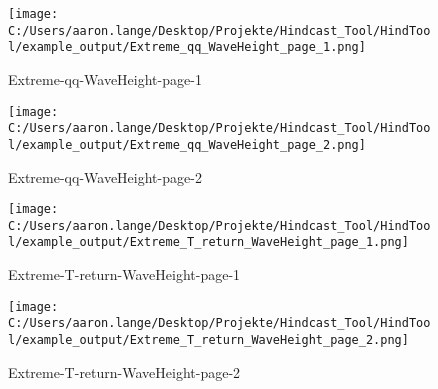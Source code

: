 \begin{figure}[H] 
 \centering 
 \texttt{[image: C:/Users/aaron.lange/Desktop/Projekte/Hindcast\_Tool/HindTool/example\_output/Extreme\_qq\_WaveHeight\_page\_1.png]} 
 \caption{ Extreme-qq-WaveHeight-page-1 } 
 \label{fig: Extreme_qq_WaveHeight_page_1 } 
\end{figure}
\begin{figure}[H] 
 \centering 
 \texttt{[image: C:/Users/aaron.lange/Desktop/Projekte/Hindcast\_Tool/HindTool/example\_output/Extreme\_qq\_WaveHeight\_page\_2.png]} 
 \caption{ Extreme-qq-WaveHeight-page-2 } 
 \label{fig: Extreme_qq_WaveHeight_page_2 } 
\end{figure}
\begin{figure}[H] 
 \centering 
 \texttt{[image: C:/Users/aaron.lange/Desktop/Projekte/Hindcast\_Tool/HindTool/example\_output/Extreme\_T\_return\_WaveHeight\_page\_1.png]} 
 \caption{ Extreme-T-return-WaveHeight-page-1 } 
 \label{fig: Extreme_T_return_WaveHeight_page_1 } 
\end{figure}
\begin{figure}[H] 
 \centering 
 \texttt{[image: C:/Users/aaron.lange/Desktop/Projekte/Hindcast\_Tool/HindTool/example\_output/Extreme\_T\_return\_WaveHeight\_page\_2.png]} 
 \caption{ Extreme-T-return-WaveHeight-page-2 } 
 \label{fig: Extreme_T_return_WaveHeight_page_2 } 
\end{figure}

